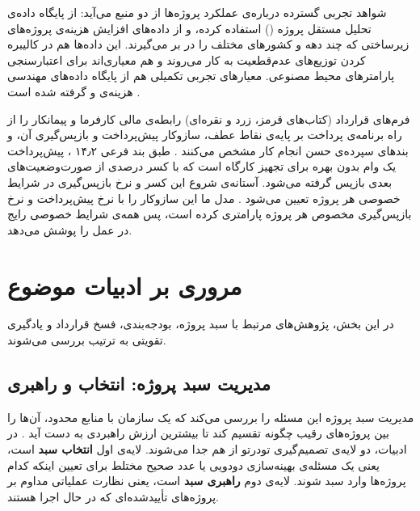 شواهد تجربی گسترده درباره‌ی عملکرد پروژه‌ها از دو منبع می‌آید:
\citep{Merrow2011} از پایگاه داده‌ی تحلیل مستقل پروژه
() استفاده کرده، و
\citep{Flyvbjerg2003, Flyvbjerg2018} از داده‌های افزایش هزینه‌ی
پروژه‌های زیرساختی که چند دهه و کشورهای مختلف را در بر می‌گیرند.
این داده‌ها هم در کالیبره کردن توزیع‌های عدم‌قطعیت به کار می‌روند و
هم معیاری‌اند برای اعتبارسنجی پارامترهای محیط مصنوعی.
معیارهای تجربی تکمیلی هم از پایگاه داده‌های مهندسی هزینه‌ی
 و 
گرفته شده است \citep{christensen1993cost}.

فرم‌های قرارداد  (کتاب‌های قرمز، زرد و نقره‌ای)
رابطه‌ی مالی کارفرما و پیمانکار را از راه برنامه‌ی پرداخت بر پایه‌ی
نقاط عطف، سازوکار پیش‌پرداخت و بازپس‌گیری آن، و بندهای سپرده‌ی حسن
انجام کار مشخص می‌کنند \citep{FIDIC2017}.
طبق بند فرعی ۱۴٫۲ ، پیش‌پرداخت یک وام بدون بهره برای
تجهیز کارگاه است که با کسر درصدی از صورت‌وضعیت‌های بعدی بازپس گرفته
می‌شود. آستانه‌ی شروع این کسر و نرخ بازپس‌گیری در شرایط خصوصی
هر پروژه تعیین می‌شود \citep{FIDIC2017}.
مدل ما این سازوکار را با نرخ پیش‌پرداخت و نرخ بازپس‌گیری مخصوص هر
پروژه پارامتری کرده است، پس همه‌ی شرایط خصوصی رایج در عمل را
پوشش می‌دهد.

\section{مروری بر ادبیات موضوع}

در این بخش، پژوهش‌های مرتبط با سبد پروژه، بودجه‌بندی، فسخ قرارداد و
یادگیری تقویتی به ترتیب بررسی می‌شوند.

\subsection{مدیریت سبد پروژه: انتخاب و راهبری}
\label{subsec:lr_ppm}

مدیریت سبد پروژه این مسئله را بررسی می‌کند که یک سازمان با منابع
محدود، آن‌ها را بین پروژه‌های رقیب چگونه تقسیم کند تا بیشترین ارزش
راهبردی به دست آید \citep{Archer1999, Cooper2001}.
در ادبیات، دو لایه‌ی تصمیم‌گیری تودرتو از هم جدا می‌شوند.
لایه‌ی اول \textbf{انتخاب سبد} است، یعنی یک مسئله‌ی بهینه‌سازی
دودویی یا عدد صحیح مختلط برای تعیین اینکه کدام پروژه‌ها وارد سبد
شوند. لایه‌ی دوم \textbf{راهبری سبد} است، یعنی نظارت عملیاتی مداوم بر
پروژه‌های تأییدشده‌ای که در حال اجرا هستند.

